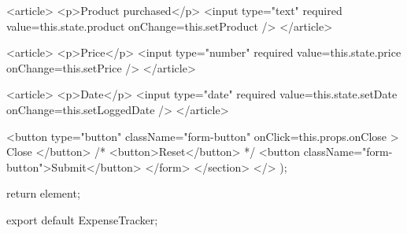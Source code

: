 {{            <article>
              <p>Product purchased</p>
              <input
                type="text"
                required
                value={this.state.product}
                onChange={this.setProduct}
              />
            </article>

            <article>
              <p>Price</p>
              <input
                type="number"
                required
                value={this.state.price}
                onChange={this.setPrice}
              />
            </article>

            <article>
              <p>Date</p>
              <input
                type="date"
                required
                value={this.state.setDate}
                onChange={this.setLoggedDate}
              />
            </article>

            <button
              type="button"
              className="form-button"
              onClick={this.props.onClose}
            >
              Close
            </button>
            {/* <button>Reset</button> */}
            <button className="form-button">Submit</button>
          </form>
        </section>
      </>
    );

    return element;
  }
}

export default ExpenseTracker;
